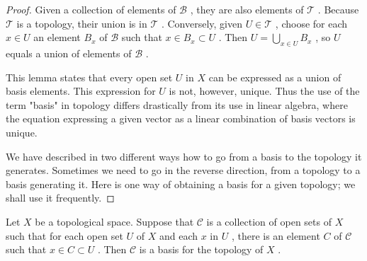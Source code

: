 \begin{proof}
Given a collection of elements of \(\mathcal{B}\) , they are also elements of \(\mathcal{T}\) . Because \(\mathcal{T}\) is a topology, their union is in \(\mathcal{T}\) . Conversely, given \(U \in  \mathcal{T}\) , choose for each \(x \in  U\) an element \({B}_{x}\) of \(\mathcal{B}\) such that \(x \in  {B}_{x} \subset  U\) . Then \(U = \mathop{\bigcup }\limits_{{x \in  U}}{B}_{x}\) , so \(U\) equals a union of elements of \(\mathcal{B}\) .

This lemma states that every open set \(U\) in \(X\) can be expressed as a union of basis elements. This expression for \(U\) is not, however, unique. Thus the use of the term "basis" in topology differs drastically from its use in linear algebra, where the equation expressing a given vector as a linear combination of basis vectors is unique.

We have described in two different ways how to go from a basis to the topology it generates. Sometimes we need to go in the reverse direction, from a topology to a basis generating it. Here is one way of obtaining a basis for a given topology; we shall use it frequently.
\end{proof}

\begin{lemma} Let \(X\) be a topological space. Suppose that \(\mathcal{C}\) is a collection of open sets of \(X\) such that for each open set \(U\) of \(X\) and each \(x\) in \(U\) , there is an element \(C\) of \(\mathcal{C}\) such that \(x \in  C \subset  U\) . Then \(\mathcal{C}\) is a basis for the topology of \(X\) .
\end{lemma}

